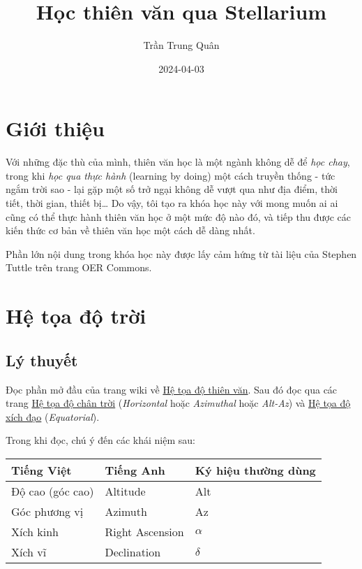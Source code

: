 \documentclass[
]{book}
\title{Học thiên văn qua Stellarium}
\author{Trần Trung Quân}
\date{2024-04-03}
\begin{document}
\maketitle

{
\setcounter{tocdepth}{1}
\tableofcontents
}
\chapter*{Giới thiệu}\label{giux1edbi-thiux1ec7u}

Với những đặc thù của mình, thiên văn học là một ngành không dễ để \emph{học chay}, trong khi \emph{học qua thực hành} (learning by doing) một cách truyền thống - tức ngắm trời sao - lại gặp một số trở ngại không dễ vượt qua như địa điểm, thời tiết, thời gian, thiết bị\ldots{} Do vậy, tôi tạo ra khóa học này với mong muốn ai ai cũng có thể thực hành thiên văn học ở một mức độ nào đó, và tiếp thu được các kiến thức cơ bản về thiên văn học một cách dễ dàng nhất.

Phần lớn nội dung trong khóa học này được lấy cảm hứng từ tài liệu của Stephen Tuttle \citep{stuttle} trên trang OER Commons.

\chapter{Hệ tọa độ trời}\label{hux1ec7-tux1ecda-ux111ux1ed9-trux1eddi}

\section{Lý thuyết}\label{luxfd-thuyux1ebft}

Đọc phần mở đầu của trang wiki về
\href{https://vi.wikipedia.org/wiki/H\%E1\%BB\%87_t\%E1\%BB\%8Da_\%C4\%91\%E1\%BB\%99_thi\%C3\%AAn_v\%C4\%83n}{Hệ tọa độ thiên văn}.
Sau đó đọc qua các trang
\href{https://vi.wikipedia.org/wiki/H\%E1\%BB\%87_t\%E1\%BB\%8Da_\%C4\%91\%E1\%BB\%99_ch\%C3\%A2n_tr\%E1\%BB\%9Di}{Hệ tọa độ chân trời} (\emph{Horizontal} hoặc \emph{Azimuthal} hoặc \emph{Alt-Az})
và \href{https://vi.wikipedia.org/wiki/H\%E1\%BB\%87_t\%E1\%BB\%8Da_\%C4\%91\%E1\%BB\%99_x\%C3\%ADch_\%C4\%91\%E1\%BA\%A1o}{Hệ tọa độ xích đạo} (\emph{Equatorial}).

Trong khi đọc, chú ý đến các khái niệm sau:

\begin{longtable}[]{@{}lll@{}}
\toprule\noalign{}
Tiếng Việt & Tiếng Anh & Ký hiệu thường dùng \\
\midrule\noalign{}
\endhead
\bottomrule\noalign{}
\endlastfoot
Độ cao (góc cao) & Altitude & Alt \\
Góc phương vị & Azimuth & Az \\
Xích kinh & Right Ascension & \(\alpha\) \\
Xích vĩ & Declination & \(\delta\) \\
\end{longtable}
\end{document}
